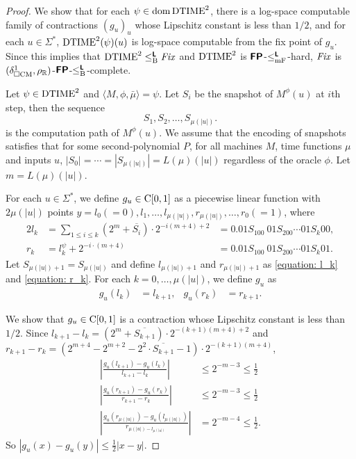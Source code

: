 \documentclass[envcountsame,orivec,oribibl]{llncs}
\begin{document}
\begin{proof}
 We show that for each $\psi \in \mathop{\rm dom} \mathrm{DTIME}^2$,
 there is a log-space computable family of contractions $(g_u)_u$ whose
 Lipschitz constant is less than $1/2$,
 and for each $u \in \Sigma^*$, $\mathrm{DTIME}^2(\psi)(u)$ is log-space 
 computable from the fix point of $g_u$.
 Since this implies that $\mathrm{DTIME}^2 \leq _{\mathrm B} ^{\text{\bfseries \sffamily \upshape L}} \mathit{Fix}$ and $\mathrm{DTIME}^2$
 is $\text{\bfseries \sffamily \upshape FP}$-$\leq _{\mathrm{mF}} ^{\text{\bfseries \sffamily \upshape L}}$-hard, $\mathit{Fix}$ is 
 $(\delta _{\square \mathrm{CM}}^1, \rho _\mathbb R)$-$\text{\bfseries \sffamily \upshape FP}$-$\leq _{\mathrm B} ^{\text{\bfseries \sffamily \upshape L}}$-complete.

 Let $\psi \in \mathrm{DTIME}^2$ and $\langle M, \phi, \bar \mu \rangle = \psi$.
 Let $S_i$ be the snapshot of $M^\phi(u)$ at $i$th step, then the sequence
 \begin{equation}
  S_1, S_2, \dots, S_{\mu(|u|)}.
 \end{equation}
 is the computation path of $M^\phi(u)$.
 We assume that the encoding of snapshots satisfies that 
 for some second-polynomial $P$, for all machines $M$, time functions $\mu$ 
 and inputs $u$, $|S_0| = \cdots = |S_{\mu(|u|)}| = L(\mu)(|u|)$
 regardless of the oracle $\phi$.
 Let $m = L(\mu)(|u|)$.


 For each $u \in \Sigma^*$, we define $g_u \in \mathrm C[0,1]$ as
 a piecewise linear function with $2\mu(|u|)$ points
 $y = l_0 (=0), l_1, \dots, l_{\mu(|u|)}, r_{\mu(|u|)}, \dots, r_0(=1)$,
 where
\begin{alignat}{2}
 \label{equation: l_k}
 l_k 
 &
 = \sum_{1 \le i \le k} (2^m+\overline{S_i}) \cdot 2^{-i(m+4)+2} 
 &
 = 0.01S_100\ 01S_200 \cdots 01S_k00,
 \\
 \label{equation: r_k}
 r_k
 &
 = l^\psi_k + 2^{-i \cdot (m+4)}
 &
 = 0.01S_100\ 01S_200 \cdots 01S_k01.
\end{alignat}
 Let $S_{\mu(|u|)+1} = S_{\mu(|u|)}$ and
 define $l_{\mu(|u|)+1}$ and $r_{\mu(|u|)+1}$ as
 \eqref{equation: l_k} and \eqref{equation: r_k}.
 For each $k = 0, \dots, \mu(|u|)$,
 we define $g_u$ as
 \begin{align}
 g_u(l_k) &= l_{k+1},
 &
 g_u(r_k) &= r_{k+1}.
 \end{align}

 We show that $g_u \in \mathrm C[0,1]$ is a contraction whose Lipschitz constant
 is less than $1/2$.
 Since $l_{k+1} - l_{k} = (2^m+\overline{S_{k+1}}) \cdot 2^{-(k+1)(m+4)+2} $
 and $r_{k+1} - r_{k} = (2^{m+4} - 2^{m+2} - 2^2 \cdot \overline{S_{k+1}} - 1)
 \cdot 2^{-(k+1)(m+4)} $,
\begin{align}
 \left|\frac{g_u(l_{k+1}) - g_u(l_k)}{l_{k+1} - l_k} \right| 
 &
 \le 2^{-m-3} \le \frac 1 2
 \\
 \left|\frac{g_u(r_{k+1}) - g_u(r_k)}{r_{k+1} - r_k} \right| 
 &
 \le 2^{-m-3} \le \frac 1 2
 \\
 \left|\frac{g_u(r_{\mu(|u|)}) - g_u(l_{\mu(|u|)})}{r_{\mu(|u|) - l_{\mu(|u|)}}} \right| 
 &
 = 2^{-m-4} \le \frac 1 2.
\end{align}
 So $|g_u(x) - g_u(y)| \le \frac 1 2 |x-y|$.


\end{proof}
\end{document}
